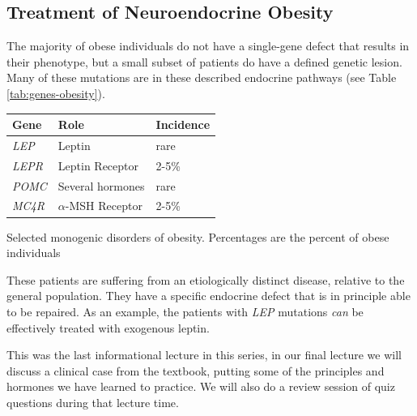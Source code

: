 \documentclass{tufte-handout}
\begin{document}
\subsection{Treatment of Neuroendocrine Obesity}

The majority of obese individuals do not have a single-gene defect that results in their phenotype, but a small subset of patients do have a defined genetic lesion.  Many of these mutations are in these described endocrine pathways (see Table \ref{tab:genes-obesity}).

\begin{margintable}[+1cm]
  \centering
  \begin{tabular}{lll}
    \toprule
    Gene & Role & Incidence \\
    \midrule
    \textit{LEP} & Leptin & rare \\
    \textit{LEPR} & Leptin Receptor & 2-5\% \\
    \textit{POMC} & Several hormones & rare \\
    \textit{MC4R} & $\alpha$-MSH Receptor & 2-5\% \\
    \bottomrule
  \end{tabular}
  \caption{Selected monogenic disorders of obesity.  Percentages are the percent of obese individuals}
  \label{tab:genes-obesity}
\end{margintable}

These patients are suffering from an etiologically distinct disease, relative to the general population.  They have a specific endocrine defect that is in principle able to be repaired.  As an example, the patients with \textit{LEP} mutations \emph{can} be effectively treated with exogenous leptin\cite{Farooqi1999}.

This was the last informational lecture in this series, in our final lecture we will discuss a clinical case from the textbook, putting some of the principles and hormones we have learned to practice.  We will also do a review session of quiz questions during that lecture time.

\listoffigures
\listoftables



\end{document}
